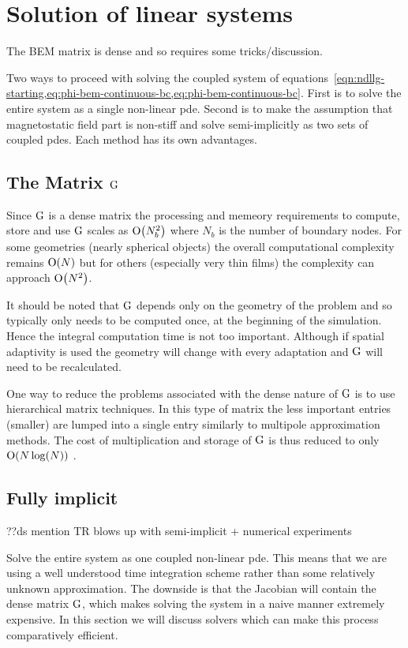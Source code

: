 
\chapter{Solution of linear systems}
\label{sec:solution-strategies}

The BEM matrix is dense and so requires some tricks/discussion.

Two ways to proceed with solving the coupled system of equations~\cref{eqn:ndllg-starting,eq:phi-bem-continuous-bc,eq:phi-bem-continuous-bc}.
First is to solve the entire system as a single non-linear pde.
Second is to make the assumption that magnetostatic field part is non-stiff and solve semi-implicitly as two sets of coupled pdes.
Each method has its own advantages.


\section{The Matrix ${\mathbf{\mathrm{G}}}$}

Since ${\mathbf{\mathrm{G}}}$ is a dense matrix the processing and memeory requirements to compute, store and use ${\mathbf{\mathrm{G}}}$ scales as $\text{O}{\left( N_b^2 \right)}$ where $N_b$ is the number of boundary nodes. For some geometries (\eg nearly spherical objects) the overall computational complexity remains $\text{O}{\left( N \right)}$ but for others (especially very thin films) the complexity can approach $\text{O}{\left( N^2 \right)}$.

It should be noted that ${\mathbf{\mathrm{G}}}$ depends only on the geometry of the problem and so typically only needs to be computed once, at the beginning of the simulation. Hence the integral computation time is not too important. Although if spatial adaptivity is used the geometry will change with every adaptation and ${\mathbf{\mathrm{G}}}$ will need to be recalculated.

One way to reduce the problems associated with the dense nature of ${\mathbf{\mathrm{G}}}$ is to use hierarchical matrix techniques. In this type of matrix the less important entries (\ie smaller) are lumped into a single entry similarly to multipole approximation methods. The cost of multiplication and storage of ${\mathbf{\mathrm{G}}}$ is thus reduced to only $\text{O}{\left( N \log(N) \right)}$ \cite{Knittel2009}.


\section{Fully implicit}
\label{sec:fully-implicit-bem}

??ds mention TR blows up with semi-implicit + numerical experiments

Solve the entire system as one coupled non-linear pde.
This means that we are using a well understood time integration scheme rather than some relatively unknown approximation.
The downside is that the Jacobian will contain the dense matrix ${\mathbf{\mathrm{G}}}$, which makes solving the system in a naive manner extremely expensive.
In this section we will discuss solvers which can make this process comparatively efficient.

